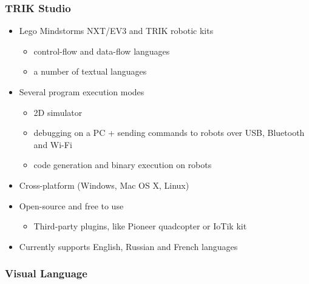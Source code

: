 \documentclass[xetex,mathserif,serif]{beamer}
\begin{document}
	\begin{frame}
		\frametitle{TRIK Studio}
		\begin{itemize}
			\item Lego Mindstorms NXT/EV3 and TRIK robotic kits
			\begin{itemize}
				\item control-flow and data-flow languages
				\item a number of textual languages
			\end{itemize}
			\item Several program execution modes
			\begin{itemize}
				\item 2D simulator
				\item debugging on a PC + sending commands to robots over USB, Bluetooth and Wi-Fi
				\item code generation and binary execution on robots
			\end{itemize}
			\item Cross-platform (Windows, Mac OS X, Linux)
			\item Open-source and free to use
			\begin{itemize}
				\item Third-party plugins, like Pioneer quadcopter or IoTik kit
			\end{itemize}
			\item Currently supports English, Russian and French languages
		\end{itemize}
	\end{frame}

	\begin{frame}
		\frametitle{Visual Language}
	\end{frame}
\end{document}
